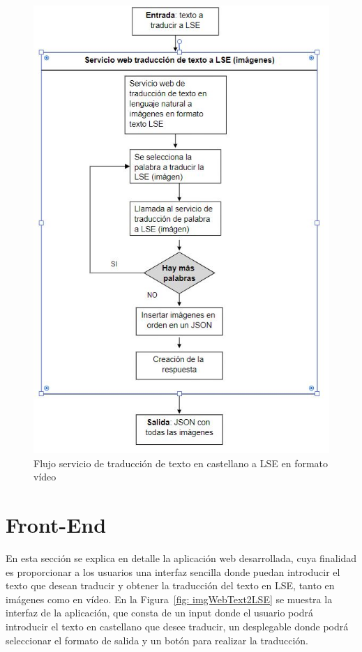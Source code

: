 \begin{figure}[]
	\centering
	\includegraphics[width=1\textwidth]{Imagenes/Fuentes/Text2LSE/FlujoImagenTexto.jpg}
	\caption{ Flujo servicio de traducción de texto en castellano a LSE en formato vídeo }
	\label {fig: FlujoImagenTexto}
\end{figure}


\section{Front-End}

En esta sección se explica en detalle la aplicación web desarrollada, cuya finalidad es proporcionar a los usuarios una interfaz sencilla donde puedan introducir el texto que desean traducir y obtener la traducción del texto en LSE, tanto en imágenes como en vídeo. En la  Figura~\ref {fig: imgWebText2LSE} se muestra la interfaz de la aplicación, que consta de un input donde el usuario podrá introducir el texto en castellano que desee traducir, un desplegable donde podrá seleccionar el formato de salida y un botón para realizar la traducción.\\

